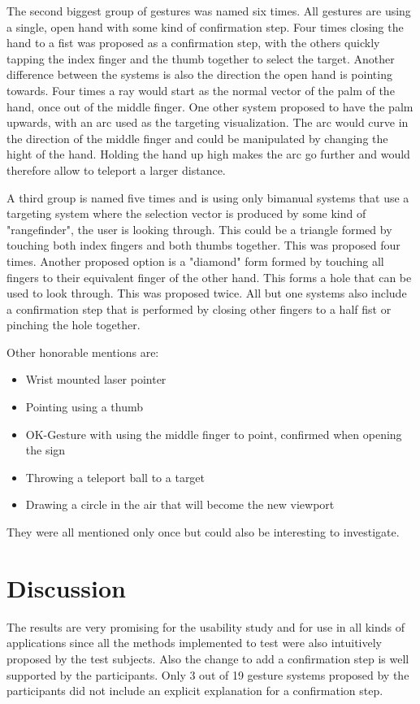 The second biggest group of gestures was named six times. All gestures are using a single, open hand with some kind of confirmation step. Four times closing the hand to a fist was proposed as a confirmation step, with the others quickly tapping the index finger and the thumb together to select the target. Another difference between the systems is also the direction the open hand is pointing towards. Four times a ray would start as the normal vector of the palm of the hand, once out of the middle finger. One other system proposed to have the palm upwards, with an arc used as the targeting visualization. The arc would curve in the direction of the middle finger and could be manipulated by changing the hight of the hand. Holding the hand up high makes the arc go further and would therefore allow to teleport a larger distance.

A third group is named five times and is using only bimanual systems that use a targeting system where the selection vector is produced by some kind of "rangefinder", the user is looking through. This could be a triangle formed by touching both index fingers and both thumbs together. This was proposed four times. Another proposed option is a "diamond" form formed by touching all fingers to their equivalent finger of the other hand. This forms a hole that can be used to look through. This was proposed twice. All but one systems also include a confirmation step that is performed by closing other fingers to a half fist or pinching the hole together.

Other honorable mentions are:
\begin{itemize}
    \item Wrist mounted laser pointer
    \item Pointing using a thumb
    \item OK-Gesture with using the middle finger to point, confirmed when opening the sign
    \item Throwing a teleport ball to a target
    \item Drawing a circle in the air that will become the new viewport
\end{itemize}

They were all mentioned only once but could also be interesting to investigate.

\section{Discussion}
The results are very promising for the usability study and for use in all kinds of applications since all the methods implemented to test were also intuitively proposed by the test subjects. Also the change to add a confirmation step is well supported by the participants. Only 3 out of 19 gesture systems proposed by the participants did not include an explicit explanation for a confirmation step. 

